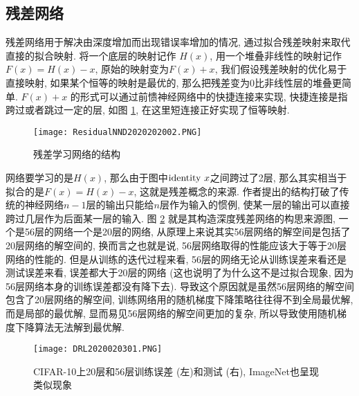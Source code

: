 \subsection{残差网络}
残差网络用于解决由深度增加而出现错误率增加的情况, 通过拟合残差映射来取代直接的拟合映射.
将一个底层的映射记作 $H(x)$, 用一个堆叠非线性的映射记作 $F(x) = H(x) - x$, 原始的映射变为$F(x) + x$,
我们假设残差映射的优化易于直接映射, 如果某个恒等的映射是最优的, 那么把残差变为0比非线性层的堆叠更简单.
$F(x) + x$ 的形式可以通过前愦神经网络中的快捷连接来实现, 快捷连接是指跨过或者跳过一定的层,
如图 \ref{ResidualNND2020202002}, 在这里短连接正好实现了恒等映射.
\begin{figure}[H]
    \centering
    \texttt{[image: ResidualNND2020202002.PNG]}
    \caption{残差学习网络的结构}
    \label{ResidualNND2020202002}
    \vspace{-0.4cm}
\end{figure}
网络要学习的是$H(x)$, 那么由于图中$\textup{identity}\,\, x$之间跨过了2层, 那么其实相当于拟合的是$F(x)=H (x)-x$, 这就是残差概念的来源.
作者提出的结构打破了传统的神经网络$n-1$层的输出只能给$n$层作为输入的惯例, 使某一层的输出可以直接跨过几层作为后面某一层的输入.
图 \ref{DRL2020020301} 就是其构造深度残差网络的构思来源图, 一个是56层的网络一个是20层的网络, 从原理上来说其实56层网络的解空间是包括了20层网络的解空间的, 换而言之也就是说, 56层网络取得的性能应该大于等于20层网络的性能的.
但是从训练的迭代过程来看, 56层的网络无论从训练误差来看还是测试误差来看, 误差都大于20层的网络 (这也说明了为什么这不是过拟合现象, 因为56层网络本身的训练误差都没有降下去).
导致这个原因就是虽然56层网络的解空间包含了20层网络的解空间, 训练网络用的随机梯度下降策略往往得不到全局最优解, 而是局部的最优解, 显而易见56层网络的解空间更加的复杂, 所以导致使用随机梯度下降算法无法解到最优解.
\begin{figure}[H]
    \centering
    \texttt{[image: DRL2020020301.PNG]}
    \caption{CIFAR-10上20层和56层训练误差 (左)和测试 (右), ImageNet也呈现类似现象}
    \label{DRL2020020301}
    \vspace{-0.4cm}
\end{figure}

